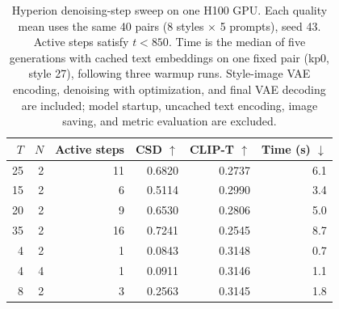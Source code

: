 \begin{table}[t]
\centering
\small
\caption{Hyperion denoising-step sweep on one H100 GPU. Each quality mean uses the same 40 pairs (8 styles $\times$ 5 prompts), seed 43. Active steps satisfy $t<850$. Time is the median of five generations with cached text embeddings on one fixed pair (kp0, style 27), following three warmup runs. Style-image VAE encoding, denoising with optimization, and final VAE decoding are included; model startup, uncached text encoding, image saving, and metric evaluation are excluded.}
\begin{tabular}{rrrrrr}
\toprule
$T$ & $N$ & Active steps & CSD $\uparrow$ & CLIP-T $\uparrow$ & Time (s) $\downarrow$ \\
\midrule
25 & 2 & 11 & 0.6820 & 0.2737 & 6.1 \\
15 & 2 & 6 & 0.5114 & 0.2990 & 3.4 \\
20 & 2 & 9 & 0.6530 & 0.2806 & 5.0 \\
35 & 2 & 16 & 0.7241 & 0.2545 & 8.7 \\
4 & 2 & 1 & 0.0843 & 0.3148 & 0.7 \\
4 & 4 & 1 & 0.0911 & 0.3146 & 1.1 \\
8 & 2 & 3 & 0.2563 & 0.3145 & 1.8 \\
\bottomrule
\end{tabular}
\end{table}
